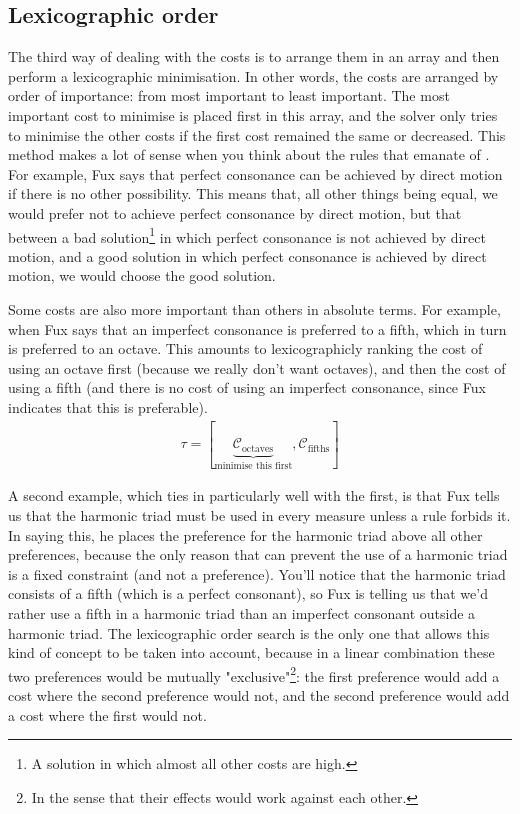 \subsection{Lexicographic order}\label{section:lexicographic-order}
The third way of dealing with the costs is to arrange them in an array and then perform a lexicographic minimisation. In other words, the costs are arranged by order of importance: from most important to least important. The most important cost to minimise is placed first in this array, and the solver only tries to minimise the other costs if the first cost remained the same or decreased. This method makes a lot of sense when you think about the rules that emanate of \gap. For example, Fux says that perfect consonance can be achieved by direct motion if there is no other possibility. This means that, all other things being equal, we would prefer not to achieve perfect consonance by direct motion, but that between a bad solution\footnote{A solution in which almost all other costs are high.} in which perfect consonance is not achieved by direct motion, and a good solution in which perfect consonance is achieved by direct motion, we would choose the good solution. 

Some costs are also more important than others in absolute terms. For example, when Fux says that an imperfect consonance is preferred to a fifth, which in turn is preferred to an octave. This amounts to lexicographicly ranking the cost of using an octave first (because we really don't want octaves), and then the cost of using a fifth (and there is no cost of using an imperfect consonance, since Fux indicates that this is preferable). 
    \begin{equation}
        \begin{aligned}
            \tau = [\underset{\text{minimise this first}}{\underbrace{\mathcal{C}_\text{octaves}}}, \mathcal{C}_\text{fifths}]
        \end{aligned}
    \end{equation}

A second example, which ties in particularly well with the first, is that Fux tells us that the harmonic triad must be used in every measure unless a rule forbids it. In saying this, he places the preference for the harmonic triad above all other preferences, because the only reason that can prevent the use of a harmonic triad is a fixed constraint (and not a preference). You'll notice that the harmonic triad consists of a fifth (which is a perfect consonant), so Fux is telling us that we'd rather use a fifth in a harmonic triad than an imperfect consonant outside a harmonic triad. The lexicographic order search is the only one that allows this kind of concept to be taken into account, because in a linear combination these two preferences would be mutually "exclusive"\footnote{In the sense that their effects would work against each other.}: the first preference would add a cost where the second preference would not, and the second preference would add a cost where the first would not.

